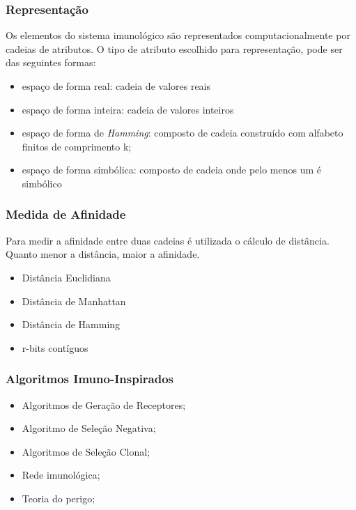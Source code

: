 \documentclass{beamer}
\begin{document}
\begin{frame}
    \frametitle{Representação}
    
    Os elementos do sistema imunológico são representados computacionalmente por cadeias de atributos. 
    O tipo de atributo escolhido para representação, pode ser das seguintes formas:
    
    \begin{itemize}
        \item espaço de forma real: cadeia de valores reais
	    \item espaço de forma inteira: cadeia de valores inteiros
	    \item espaço de forma de \textit{Hamming}: composto de cadeia construído com alfabeto finitos de comprimento k;
	    \item espaço de forma simbólica: composto de cadeia onde pelo menos um é simbólico
    \end{itemize}

\end{frame}

\begin{frame}
    \frametitle{Medida de Afinidade}
    
    Para medir a afinidade entre duas cadeias é utilizada o cálculo de distância. Quanto menor a distância, maior a afinidade.
    
    \begin{itemize}
        \item Distância Euclidiana
	    \item Distância de Manhattan
	    \item Distância de Hamming
	    \item r-bits contíguos
    \end{itemize}

\end{frame}


\begin{frame}
    \frametitle{Algoritmos Imuno-Inspirados}
    
    \begin{itemize}
        \item Algoritmos de Geração de Receptores;
        \item Algoritmo de Seleção Negativa;
        \item Algoritmos de Seleção Clonal;
        \item Rede imunológica;
        \item Teoria do perigo;
    \end{itemize}
\end{frame}
\end{document}
